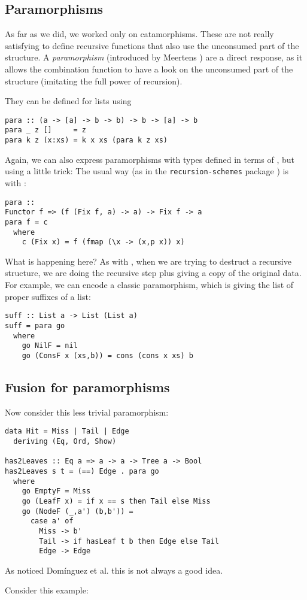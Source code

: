 \subsection{Paramorphisms}

As far as we did, we worked only on catamorphisms. These are not really satisfying to define recursive functions that also use the unconsumed part of the structure. A \emph{paramorphism} (introduced by Meertens \cite{Meertens1992}) are a direct response, as it allows the combination function to have a look on the unconsumed part of the structure (imitating the full power of recursion).

They can be defined for lists using 
\begin{verbatim}
para :: (a -> [a] -> b -> b) -> b -> [a] -> b
para _ z []     = z
para k z (x:xs) = k x xs (para k z xs)
\end{verbatim}

Again, we can also express paramorphisms with types defined in terms of , but using a little trick: The usual way (as in the \verb|recursion-schemes| package \cite{ekmett:eschems}) is with :
\begin{verbatim}
para ::
Functor f => (f (Fix f, a) -> a) -> Fix f -> a
para f = c
  where
    c (Fix x) = f (fmap (\x -> (x,p x)) x)
\end{verbatim}

What is happening here? As with , when we are trying to destruct a recursive structure, we are doing the recursive step plus giving a copy of the original data.
For example, we can encode a classic paramorphism, which is giving the list of proper suffixes of a list:
\begin{verbatim}
suff :: List a -> List (List a)
suff = para go
  where
    go NilF = nil
    go (ConsF x (xs,b)) = cons (cons x xs) b
\end{verbatim}

\subsection{Fusion for paramorphisms}

Now consider this less trivial paramorphism:
\begin{verbatim}
data Hit = Miss | Tail | Edge
  deriving (Eq, Ord, Show)

has2Leaves :: Eq a => a -> a -> Tree a -> Bool
has2Leaves s t = (==) Edge . para go
  where
    go EmptyF = Miss
    go (LeafF x) = if x == s then Tail else Miss
    go (NodeF (_,a') (b,b')) =
      case a' of
        Miss -> b'
        Tail -> if hasLeaf t b then Edge else Tail
        Edge -> Edge
\end{verbatim}


As noticed Domínguez et al. \cite{paramorphismFusion} this is not always a good idea.

Consider this example:
